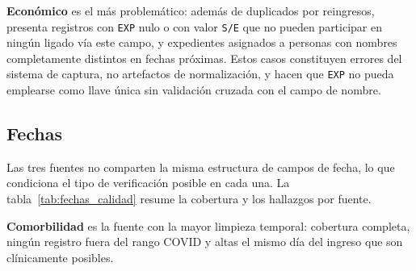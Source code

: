 \textbf{Económico} es el más problemático: además de duplicados por reingresos, presenta registros con \texttt{EXP} nulo o con valor \texttt{S/E} que no pueden participar en ningún ligado vía este campo, y expedientes asignados a personas con nombres completamente distintos en fechas próximas. Estos casos constituyen errores del sistema de captura, no artefactos de normalización, y hacen que \texttt{EXP} no pueda emplearse como llave única sin validación cruzada con el campo de nombre.

\subsection{Fechas}

Las tres fuentes no comparten la misma estructura de campos de fecha, lo que condiciona el tipo de verificación posible en cada una. La tabla~\ref{tab:fechas_calidad} resume la cobertura y los hallazgos por fuente.

\begin{table}[H]
\centering
\caption{Campos de fecha y hallazgos de coherencia por fuente}
\label{tab:fechas_calidad}
\small
{}
\end{table}

\textbf{Comorbilidad} es la fuente con la mayor limpieza temporal: cobertura completa, ningún registro fuera del rango COVID y altas el mismo día del ingreso que son clínicamente posibles.

